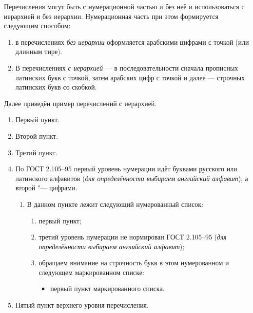 Перечисления могут быть с нумерационной частью и без неё и использоваться с иерархией и без иерархии. Нумерационная часть при этом формируется следующим способом:

\begin{enumerate}[1.]
	\item в перечислениях {\itshape без иерархии} оформляется арабскими цифрами с точкой (или длинным тире).
	\item В перечислениях {\itshape с иерархией} --- в последовательности сначала прописных латинских букв с точкой, затем арабских цифр с точкой и далее --- строчных латинских букв со скобкой. 
\end{enumerate}





Далее приведён пример перечислений с иерархией.


\begin{enumerate}
	\item Первый пункт.
	\item Второй пункт.
	\item Третий пункт.
	\item По ГОСТ 2.105--95 \cite{gost-russian-text-documents} первый уровень нумерации идёт буквами русского или латинского алфавитов ({\itshape для определённости выбираем английский алфавит}),
	а второй "--- цифрами. 
	\begin{enumerate}
		\item В данном пункте лежит следующий нумерованный список: 
		\begin{enumerate}
			\item первый пункт;
			\item третий уровень нумерации не нормирован ГОСТ 2.105--95 ({\itshape для определённости выбираем английский алфавит});
			\item обращаем внимание на строчность букв в этом нумерованном и следующем маркированном списке:
			\begin{itemize}
				\item первый пункт маркированного списка.
			\end{itemize}    
		\end{enumerate}
	\end{enumerate}
	\item Пятый пункт верхнего уровня перечисления.
\end{enumerate}

